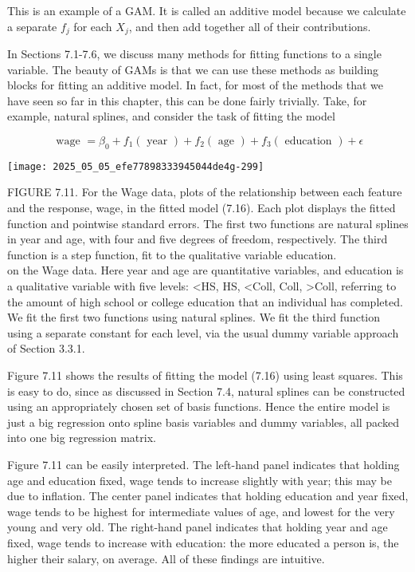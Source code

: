 \documentclass[10pt]{article}
\begin{document}
This is an example of a GAM. It is called an additive model because we calculate a separate $f_{j}$ for each $X_{j}$, and then add together all of their contributions.

In Sections 7.1-7.6, we discuss many methods for fitting functions to a single variable. The beauty of GAMs is that we can use these methods as building blocks for fitting an additive model. In fact, for most of the methods that we have seen so far in this chapter, this can be done fairly trivially. Take, for example, natural splines, and consider the task of fitting the model


\begin{equation*}
\text { wage }=\beta_{0}+f_{1}(\text { year })+f_{2}(\text { age })+f_{3}(\text { education })+\epsilon \tag{7.16}
\end{equation*}


\begin{center}
\texttt{[image: 2025\_05\_05\_efe77898333945044de4g-299]}
\end{center}

FIGURE 7.11. For the Wage data, plots of the relationship between each feature and the response, wage, in the fitted model (7.16). Each plot displays the fitted function and pointwise standard errors. The first two functions are natural splines in year and age, with four and five degrees of freedom, respectively. The third function is a step function, fit to the qualitative variable education.\\
on the Wage data. Here year and age are quantitative variables, and education is a qualitative variable with five levels: <HS, HS, <Coll, Coll, >Coll, referring to the amount of high school or college education that an individual has completed. We fit the first two functions using natural splines. We fit the third function using a separate constant for each level, via the usual dummy variable approach of Section 3.3.1.

Figure 7.11 shows the results of fitting the model (7.16) using least squares. This is easy to do, since as discussed in Section 7.4, natural splines can be constructed using an appropriately chosen set of basis functions. Hence the entire model is just a big regression onto spline basis variables and dummy variables, all packed into one big regression matrix.

Figure 7.11 can be easily interpreted. The left-hand panel indicates that holding age and education fixed, wage tends to increase slightly with year; this may be due to inflation. The center panel indicates that holding education and year fixed, wage tends to be highest for intermediate values of age, and lowest for the very young and very old. The right-hand panel indicates that holding year and age fixed, wage tends to increase with education: the more educated a person is, the higher their salary, on average. All of these findings are intuitive.
\end{document}
